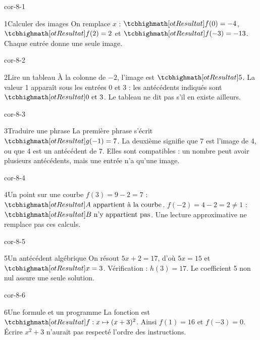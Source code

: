 \clearpage\pagestyle{otMain}\fontsize{11}{15}\selectfont{}
\begin{blocLivre}{cor-8-1}\begin{corrige}{1}{Calculer des images}
On remplace $x$ : $\res{f(0)=-4}$, $\res{f(2)=2}$ et $\res{f(-3)=-13}$. Chaque entrée donne une seule image.
\end{corrige}\end{blocLivre}
\begin{blocLivre}{cor-8-2}\begin{corrige}{2}{Lire un tableau}
À la colonne de $-2$, l’image est $\res5$. La valeur 1 apparaît sous les entrées 0 et 3 : les antécédents indiqués sont $\res{0\text{ et }3}$. Le tableau ne dit pas s’il en existe ailleurs.
\end{corrige}\end{blocLivre}
\begin{blocLivre}{cor-8-3}\begin{corrige}{3}{Traduire une phrase}
La première phrase s’écrit $\res{g(-1)=7}$. La deuxième signifie que 7 est l’image de 4, ou que 4 est un antécédent de 7. Elles sont compatibles : un nombre peut avoir plusieurs antécédents, mais une entrée n’a qu’une image.
\end{corrige}\end{blocLivre}
\begin{blocLivre}{cor-8-4}\begin{corrige}{4}{Un point sur une courbe}
$f(3)=9-2=7$ : $\res{A\text{ appartient à la courbe}}$. $f(-2)=4-2=2\ne1$ : $\res{B\text{ n’y appartient pas}}$. Une lecture approximative ne remplace pas ces calculs.
\end{corrige}\end{blocLivre}
\begin{blocLivre}{cor-8-5}\begin{corrige}{5}{Un antécédent algébrique}
On résout $5x+2=17$, d’où $5x=15$ et $\res{x=3}$. Vérification : $h(3)=17$. Le coefficient 5 non nul assure une seule solution.
\end{corrige}\end{blocLivre}
\begin{blocLivre}{cor-8-6}\begin{corrige}{6}{Une formule et un programme}
La fonction est $\res{f:x\mapsto(x+3)^2}$. Ainsi $f(1)=16$ et $f(-3)=0$. Écrire $x^2+3$ n’aurait pas respecté l’ordre des instructions.
\end{corrige}\end{blocLivre}
